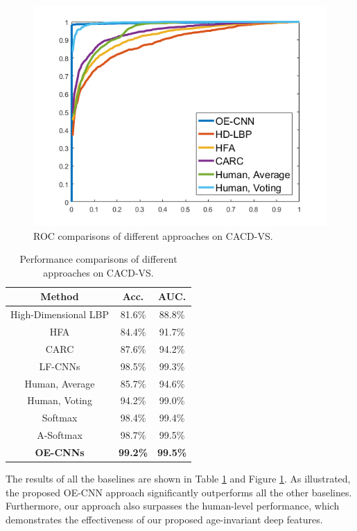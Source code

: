 \documentclass[runningheads]{llncs}
\begin{document}
\begin{figure}[t]
\begin{center}
   \includegraphics[width=0.7 \linewidth, keepaspectratio]{figures/cacd-roc.png}
\end{center}
   \caption{ROC comparisons of different approaches on CACD-VS.}
\label{fig:cacd-roc}
\end{figure}

\begin{table}[t]
\begin{center}
\begin{tabular}{|c|c|c|}
\hline
Method 													& Acc.					& AUC.\\
\hline\hline
High-Dimensional LBP \cite{chen2013blessing}		& 81.6\%				& 88.8\% \\
HFA \cite{hfa} 									& 84.4\%				& 91.7\% \\
CARC \cite{cacd}									& 87.6\%				& 94.2\% \\
LF-CNNs \cite{LFCNN}								& 98.5\%				& 99.3\% \\
Human, Average \cite{cacd2}						& 85.7\%				& 94.6\% \\
Human, Voting \cite{cacd2} 						& 94.2\%				& 99.0\% \\
\hline\hline
Softmax										& 98.4\% 				& 99.4\% \\
A-Softmax										& 98.7\% 				& 99.5\% \\
\textbf{OE-CNNs}											& \textbf{99.2\%} 		& \textbf{99.5\%} \\
\hline
\end{tabular}
\end{center}
\caption{Performance comparisons of different approaches on CACD-VS.}
\label{tabel:CACD-EXP}
\end{table}

The results of all the baselines are shown in Table \ref{tabel:CACD-EXP} and Figure \ref{fig:cacd-roc}.
As illustrated, the proposed OE-CNN approach significantly outperforms
all the other baselines. Furthermore, our approach also surpasses the human-level performance, which demonstrates the effectiveness of our proposed age-invariant deep features.
\end{document}
